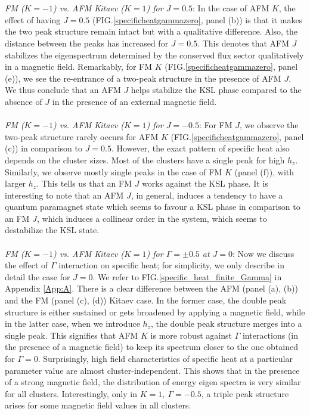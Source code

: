 \documentclass[aps,amsmath,twocolumn,amssymb,floatfix,showpacs,superscriptaddress,nofootinbib,longbibliography]{revtex4-1}
\begin{document}
\\\\\indent
{\it \small{FM ($K=-1$) vs. AFM Kitaev ($K=1$) for $J=0.5$}}: In the case of AFM $K$, the effect of having $J=0.5$ (FIG.\ref{specificheatgammazero}, panel (b)) is that it makes the two peak structure remain intact but with a qualitative difference. Also, the distance between the peaks has increased for $J=0.5$. This denotes that AFM $J$ stabilizes the eigenspectrum determined by the conserved flux sector qualitatively in a magnetic field. Remarkably, for FM $K$ (FIG.\ref{specificheatgammazero}, panel (e)), we see the re-entrance of a two-peak structure in the presence of AFM $J$. We thus conclude that an AFM $J$ helps stabilize the KSL phase compared to the absence of $J$ in the presence of an external magnetic field.
\\\\\indent
{\it \small{FM ($K=-1$) vs. AFM Kitaev ($K=1$) for $J=-0.5$}}: For FM $J$, we observe the two-peak structure rarely occurs for AFM $K$ (FIG.\ref{specificheatgammazero}, panel (c)) in comparison to $J=0.5$. However, the exact pattern of specific heat also depends on the cluster sizes. Most of the clusters have a single peak for high $h_z$. Similarly, we observe mostly single peaks in the case of FM $K$ (panel (f)), with larger $h_z$. This tells us that an FM $J$ works against the KSL phase. It is interesting to note that an AFM $J$, in general, induces a tendency to have a quantum paramagnet state which seems to favour a KSL phase in comparison to an FM $J$, which induces a collinear order in the system, which seems to destabilize the KSL state.
\\\\\indent
{\it \small{FM ($K=-1$) vs. AFM Kitaev ($K=1$) for $\Gamma=\pm0.5$ at $J=0$}}: Now we discuss the effect of $\Gamma$ interaction on specific heat; for simplicity, we only describe in detail the case for $J=0$. We refer to FIG.\ref{specific_heat_finite_Gamma} in Appendix \ref{App:A}. There is a clear difference between the AFM (panel (a), (b)) and the FM (panel (c), (d)) Kitaev case. In the former case, the double peak structure is either sustained or gets broadened by applying a magnetic field, while in the latter case, when we introduce $h_z$, the double peak structure merges into a single peak. This signifies that AFM $K$ is more robust against $\Gamma$ interactions (in the presence of a magnetic field) to keep its spectrum closer to the one obtained for $\Gamma=0$. Surprisingly, high field characteristics of specific heat at a particular parameter value are almost cluster-independent. This shows that in the presence of a strong magnetic field, the distribution of energy eigen spectra is very similar for all clusters. Interestingly, only in $K=1,~\Gamma=-0.5$, a triple peak structure arises for some magnetic field values in all clusters.\\\\
\end{document}
